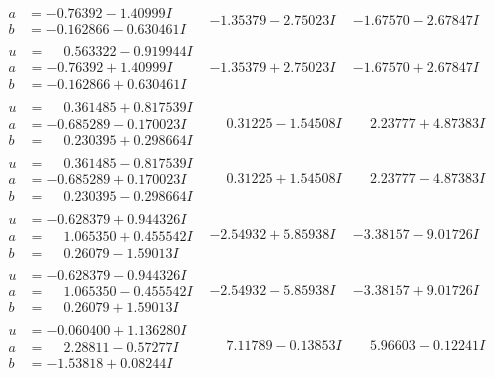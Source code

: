 \documentclass[1p]{elsarticle_modified}
\theoremstyle{definition}
\begin{document}
$$\begin{array}{c|c|c}
\begin{aligned}
a &= -0.76392 - 1.40999 I \\
b &= -0.162866 - 0.630461 I\end{aligned}
 & -1.35379 - 2.75023 I & -1.67570 - 2.67847 I \\ \hline\begin{aligned}
u &= \phantom{-}0.563322 - 0.919944 I \\
a &= -0.76392 + 1.40999 I \\
b &= -0.162866 + 0.630461 I\end{aligned}
 & -1.35379 + 2.75023 I & -1.67570 + 2.67847 I \\ \hline\begin{aligned}
u &= \phantom{-}0.361485 + 0.817539 I \\
a &= -0.685289 - 0.170023 I \\
b &= \phantom{-}0.230395 + 0.298664 I\end{aligned}
 & \phantom{-}0.31225 - 1.54508 I & \phantom{-}2.23777 + 4.87383 I \\ \hline\begin{aligned}
u &= \phantom{-}0.361485 - 0.817539 I \\
a &= -0.685289 + 0.170023 I \\
b &= \phantom{-}0.230395 - 0.298664 I\end{aligned}
 & \phantom{-}0.31225 + 1.54508 I & \phantom{-}2.23777 - 4.87383 I \\ \hline\begin{aligned}
u &= -0.628379 + 0.944326 I \\
a &= \phantom{-}1.065350 + 0.455542 I \\
b &= \phantom{-}0.26079 - 1.59013 I\end{aligned}
 & -2.54932 + 5.85938 I & -3.38157 - 9.01726 I \\ \hline\begin{aligned}
u &= -0.628379 - 0.944326 I \\
a &= \phantom{-}1.065350 - 0.455542 I \\
b &= \phantom{-}0.26079 + 1.59013 I\end{aligned}
 & -2.54932 - 5.85938 I & -3.38157 + 9.01726 I \\ \hline\begin{aligned}
u &= -0.060400 + 1.136280 I \\
a &= \phantom{-}2.28811 - 0.57277 I \\
b &= -1.53818 + 0.08244 I\end{aligned}
 & \phantom{-}7.11789 - 0.13853 I & \phantom{-}5.96603 - 0.12241 I \\ \hline\begin{aligned}

\end{aligned}
\end{array}$$
\end{document}
